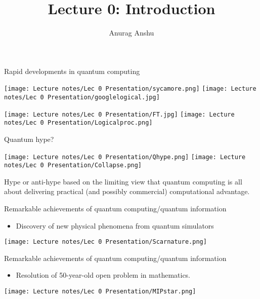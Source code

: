 \documentclass{beamer}
\title[QSE 210A/Phys 260A: Lecture 0]{Lecture 0: Introduction}
\author{Anurag Anshu}
\theoremstyle{mystyle}
\begin{document}
\begin{frame}
\titlepage 
\end{frame}

\begin{frame}{Rapid developments in quantum computing}

\texttt{[image: Lecture notes/Lec 0 Presentation/sycamore.png]}
\texttt{[image: Lecture notes/Lec 0 Presentation/googlelogical.jpg]}

\vspace{0.1in}

\texttt{[image: Lecture notes/Lec 0 Presentation/FT.jpg]}
\texttt{[image: Lecture notes/Lec 0 Presentation/Logicalproc.png]}
    
\end{frame}

\begin{frame}{Quantum hype?}

\texttt{[image: Lecture notes/Lec 0 Presentation/Qhype.png]}
\pause
\texttt{[image: Lecture notes/Lec 0 Presentation/Collapse.png]}

\pause

\vspace{0.1in}

Hype or anti-hype based on the limiting view that quantum computing is all about delivering practical (and possibly commercial) computational advantage.
    
\end{frame}

\begin{frame}{Remarkable achievements of quantum computing/quantum information}

\begin{itemize}
    \item Discovery of new physical phenomena from quantum simulators
\end{itemize}

\texttt{[image: Lecture notes/Lec 0 Presentation/Scarnature.png]}
    
\end{frame}

\begin{frame}{Remarkable achievements of quantum computing/quantum information}

\begin{itemize}
    \item Resolution of 50-year-old open problem in mathematics.
\end{itemize}

\texttt{[image: Lecture notes/Lec 0 Presentation/MIPstar.png]}
    
\end{frame}
\end{document}
